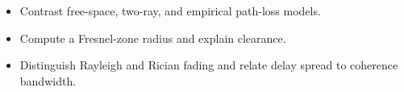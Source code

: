 \begin{objectives}
\begin{itemize}[leftmargin=1.4em,itemsep=2pt]
\item Contrast free-space, two-ray, and empirical path-loss models.
\item Compute a Fresnel-zone radius and explain clearance.
\item Distinguish Rayleigh and Rician fading and relate delay spread to coherence bandwidth.
\end{itemize}
\end{objectives}
